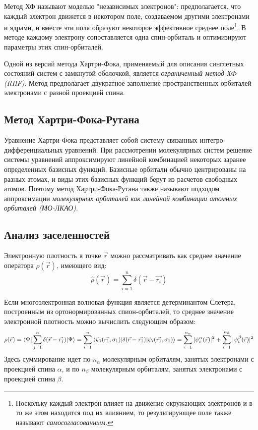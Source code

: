 Метод ХФ называют моделью "независимых электронов": предполагается, что каждый электрон движется в некотором поле, создаваемом другими электронами и ядрами, и вместе эти поля образуют некоторое эффективное среднее поле\footnote{Поскольку каждый электрон влияет на движение окружающих электронов и в то же этом находится под их влиянием, то результирующее поле также называют \textit{самосогласованным}.}. В методе каждому электрону сопоставляется одна спин-орбиталь и оптимизируют параметры этих спин-орбиталей. 

Одной из версий метода Хартри-Фока, применяемый для описания синглетных состояний систем с замкнутой оболочкой, является \textit{ограниченный метод ХФ (RHF)}. Метод предполагает двукратное заполнение пространственных орбиталей электронами с разной проекцией спина.

\subsection{Метод Хартри-Фока-Рутана}
Уравнение Хартри-Фока представляет собой систему связанных интегро-дифференциальных уравнений. При рассмотрении молекулярных систем решение системы уравнений аппроксимируют линейной комбинацией некоторых заранее определенных базисных функций. Базисные орбитали обычно центрированы на разных атомах, и виды этих базисных функций берут из расчетов свободных атомов. Поэтому метод Хартри-Фока-Рутана также называют подходом аппроксимации \textit{молекулярных орбиталей как линейной комбинации атомных орбиталей (МО-ЛКАО)}.

\subsection{Анализ заселенностей}
Электронную плотность в точке $\Vec{r}$ можно рассматривать как среднее значение оператора $\hat{\rho}(\Vec{r})$, имеющего вид:
\begin{equation}\label{eq:1}
    \hat{\rho}(\Vec{r}) = \sum\limits_{i=1}^n \delta(\Vec{r} - \Vec{r_i})
\end{equation}{}

Если многоэлектронная волновая функция является детерминантом Слетера, построенным из ортонормированных спион-орбиталей, то среднее значение электронной плотность можно вычислить следующим образом:
\begin{equation}\label{eq:2}
    \rho(\Vec{r}) = \braket{\Psi|\sum\limits_{j=1}^n \delta(\Vec{r} - \Vec{r_j})|\Psi} = \sum\limits_{i=1}^n\braket{\psi_i(\Vec{r_1}, \sigma_1)|\delta(\Vec{r} - \Vec{r_1})|\psi_i(\Vec{r_1}, \sigma_1)} = \sum\limits_{i=1}^{n_\alpha}|\psi_i^\alpha(\Vec{r})|^2 + \sum\limits_{i=1}^{n_\beta}|\psi_i^\beta(\Vec{r})|^2
\end{equation}
Здесь суммирование идет по $n_\alpha$ молекулярным орбиталям, занятых электронами с проекцией спина $\alpha$, и по $n_\beta$ молекулярным орбиталям, занятых электронами с проекцией спина $\beta$. 

